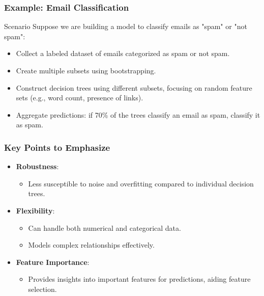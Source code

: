\documentclass[aspectratio=169]{beamer}
\begin{document}
\begin{frame}[fragile]
    \frametitle{Example: Email Classification}
    \begin{block}{Scenario}
        Suppose we are building a model to classify emails as "spam" or "not spam":
    \end{block}
    \begin{itemize}
        \item Collect a labeled dataset of emails categorized as spam or not spam.
        \item Create multiple subsets using bootstrapping.
        \item Construct decision trees using different subsets, focusing on random feature sets (e.g., word count, presence of links).
        \item Aggregate predictions: if 70\% of the trees classify an email as spam, classify it as spam.
    \end{itemize}
\end{frame}

\begin{frame}[fragile]
    \frametitle{Key Points to Emphasize}
    \begin{itemize}
        \item \textbf{Robustness}:
            \begin{itemize}
                \item Less susceptible to noise and overfitting compared to individual decision trees.
            \end{itemize}
        \item \textbf{Flexibility}:
            \begin{itemize}
                \item Can handle both numerical and categorical data.
                \item Models complex relationships effectively.
            \end{itemize}
        \item \textbf{Feature Importance}:
            \begin{itemize}
                \item Provides insights into important features for predictions, aiding feature selection.
            \end{itemize}
    \end{itemize}
\end{frame}
\end{document}
